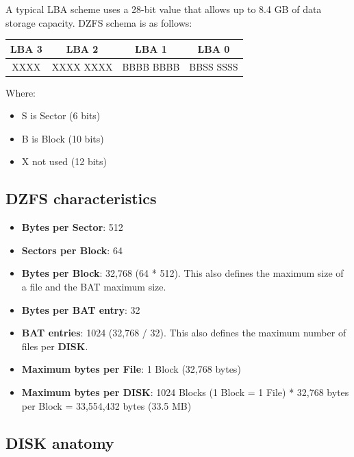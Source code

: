 \documentclass[a4paper,11pt]{article}
\begin{document}
    A typical LBA scheme uses a 28-bit value that allows up to 8.4 GB of data
    storage capacity. DZFS schema is as follows:

    \begin{tabular}{ c c c c }
        \hline
        LBA 3 & LBA 2 & LBA 1 & LBA 0\\
        \hline
        XXXX & XXXX XXXX & BBBB BBBB & BBSS SSSS\\
        \hline
    \end{tabular}

    Where:

    \begin{itemize}
        \item S is Sector (6 bits)
        \item B is Block (10 bits)
        \item X not used (12 bits)
    \end{itemize}

    \subsection{DZFS characteristics}

    \begin{itemize}
        \item \textbf{Bytes per Sector}: 512
        \item \textbf{Sectors per Block}: 64
        \item \textbf{Bytes per Block}: 32,768 (64 * 512). This also defines the
        maximum size of a file and the BAT maximum size.
        \item \textbf{Bytes per BAT entry}: 32
        \item \textbf{BAT entries}: 1024 (32,768 / 32). This also defines the 
        maximum number of files per \textbf{DISK}.
        \item \textbf{Maximum bytes per File}: 1 Block (32,768 bytes)
        \item \textbf{Maximum bytes per DISK}: 1024 Blocks (1 Block = 1 File)
        * 32,768 bytes per Block = 33,554,432 bytes (33.5 MB)
    \end{itemize}

    \subsection{DISK anatomy}
\end{document}

